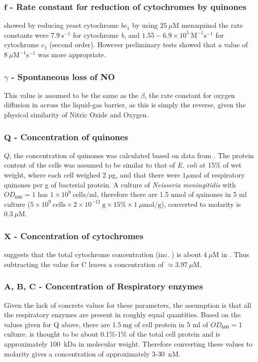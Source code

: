\subsubsection*{$\mathbf{f}$ {\bf- Rate constant for reduction of cytochromes by quinones}}
\citet{Snyder2000} showed by reducing yeast cytochrome $bc_1$ by using $25~\mu\mathrm{M}$ menaquinol the rate constants were $7.9~\mathrm{s}^{-1}$ for cytochrome \textit{b}, and $1.55-6.9\times10^5~\mathrm{M}^{-1}\mathrm{s}^{-1}$ for cytochrome $c_1$ (second order). However preliminary tests showed that a value of $8~\mu \mathrm{M}^{-1}\mathrm{s}^{-1}$ was more appropriate.

\subsubsection*{$\gamma$ {\bf- Spontaneous loss of NO}}
This value is assumed to be the same as the $\beta$, the rate constant for oxygen diffusion in across the liquid-gas barrier, as this is simply the reverse, given the physical similarity of Nitric Oxide and Oxygen.

\subsubsection*{$\mathbf{Q}$ {\bf- Concentration of quinones}}
$Q$, the concentration of quinones was calculated based on data from \citet{Hedrick1986}. The protein content of the cells was assumed to be similar to that of \textit{E. coli} at 15\% of wet weight, where each cell weighed 2 pg, and that there were $1\mu \mathrm{mol}$ of respiratory quinones per g of bacterial protein\cite{Hollaender1977}. A culture of \textit{Neisseria meningitidis} with $OD_{600} = 1$ has $1 \times 10^9~\mathrm{cells/ml}$, therefore there are 1.5 nmol of quinones in 5 ml culture ($5\times 10^9~\mathrm{cells} \times 2\times 10^{-12}~\mathrm{g} \times 15\% \times 1~\mu\mathrm{mol/g}$), converted to molarity is $0.3~\mu \mathrm{M}$.

\subsubsection*{$\mathbf{X}$ {\bf- Concentration of cytochromes}}
\citet{Deeudom2007} suggests that the total cytochrome concentration (inc. \cbbthree{}) is about $4~\mu \mathrm{M}$ in \Nsm{}. Thus subtracting the value for C leaves a concentration of $\approx 3.97~\mu \mathrm{M}$.

\subsubsection*{$\mathbf{A}$, $\mathbf{B}$, $\mathbf{C}$ {\bf- Concentration of Respiratory enzymes}}
Given the lack of concrete values for these parameters, the assumption is that all the respiratory enzymes are present in roughly equal quantities. Based on the values given for Q above, there are $1.5~\mathrm{mg}$ of cell protein in 5 ml of $OD_{600}=1$ culture. \cbbthree{} is thought to be about 0.1\%-1\% of the total cell protein
and is approximately 100~kDa in molecular weight. Therefore converting these values to molarity gives a concentration of approximately 3-30~nM.

